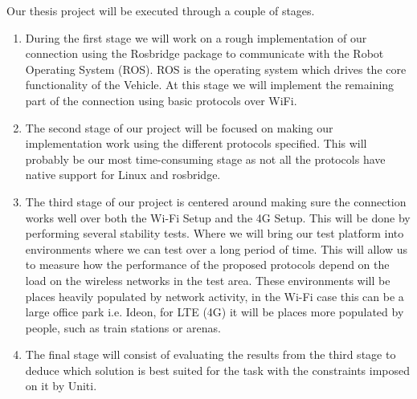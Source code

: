\documentclass[a4paper]{article}
\begin{document}
Our thesis project will be executed through a couple of stages.
\begin{enumerate}
	\item
		During the first stage we will work on a rough implementation of our connection
		using the Rosbridge package to communicate with the Robot Operating System
		(ROS). ROS is the operating system which drives the core functionality of the 
		Vehicle. At this stage we will implement the remaining part of the connection
		using basic protocols over WiFi.

	\item
		The second stage of our project will be focused on making our implementation 
		work using the different protocols specified. This will probably be our most 
		time-consuming stage as not all the protocols have native support for Linux and
		rosbridge.

	\item
		The third stage of our project is centered around making sure the connection 
		works well over both the Wi-Fi Setup and the 4G Setup. This will be done by
		performing several stability tests. Where we will bring our test platform into
		environments where we can test over a long period of time. This will allow us to
		measure how the performance of the proposed protocols depend on the load on the
		wireless networks in the test area. These environments will be places heavily
		populated by network activity, in the Wi-Fi case this can be a large office park
		i.e. Ideon, for LTE (4G) it will be places more populated by people, such as
		train stations or arenas.

	\item
		The final stage will consist of evaluating the results from the third stage to
		deduce which solution is best suited for the task with the constraints imposed
		on it by Uniti.

\end{enumerate}



\end{document}

